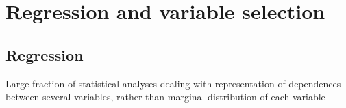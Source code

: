 \section{Regression and variable selection}
\begin{slide}
\tableofcontents[sectionstyle=show/hide,subsectionstyle=show/shaded/hide]

\end{slide}
\subsection{Regression}\begin{slide}

Large fraction of statistical analyses dealing with representation of dependences between several 
variables, rather than marginal distribution of each variable

\end{slide}\begin{slide}


\end{slide}
